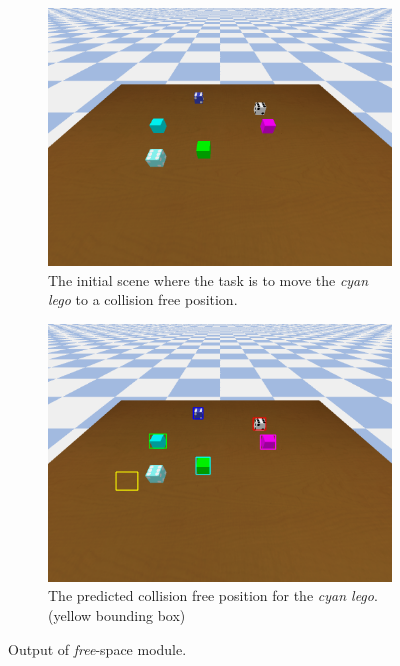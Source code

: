 \begin{figure}
    \begin{subfigure}{0.5\hsize}
         \centering    
         \includegraphics[scale=0.19]{figures/rze_i.png}
         \caption{The initial scene where the task is to move the \textit{cyan lego} to a collision free position.}
    \end{subfigure}
    \begin{subfigure}{0.5\hsize}
         \centering    
         \includegraphics[scale=0.19]{figures/rze_pre.png}
         \caption{The predicted collision free position for the \textit{cyan lego}. (yellow bounding box)}
    \end{subfigure}
    \caption{
            Output of \textit{free}-space module. 
    }
    \label{fig:free-space}
\end{figure}

